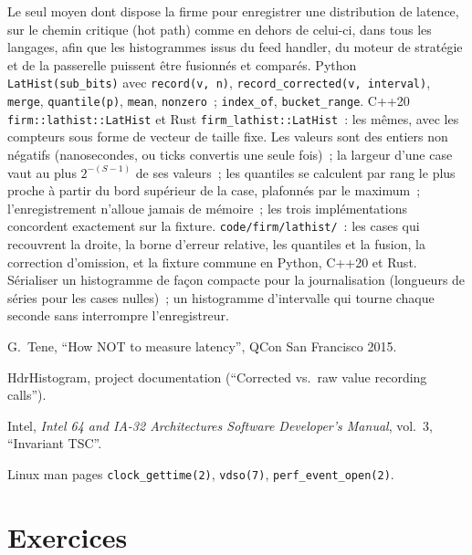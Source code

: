 \begin{build}
 Le seul moyen dont dispose la firme pour enregistrer une distribution de latence, sur le chemin critique (hot path) comme en dehors de celui-ci, dans tous les langages, afin que
les histogrammes issus du feed handler, du moteur de stratégie et de la passerelle puissent être fusionnés et comparés.
 Python \texttt{LatHist(sub\_bits)} avec \texttt{record(v, n)},
\texttt{record\_corrected(v, interval)}, \texttt{merge}, \texttt{quantile(p)}, \texttt{mean}, \texttt{nonzero}~; \texttt{index\_of}, \texttt{bucket\_range}.
C++20 \texttt{firm::lathist::LatHist} et Rust \texttt{firm\_lathist::LatHist}~: les mêmes, avec les compteurs sous forme de
vecteur de taille fixe.
 Les valeurs sont des entiers non négatifs (nanosecondes, ou ticks convertis une seule fois)~; la largeur d'une case vaut au plus
$2^{-(S-1)}$ de ses valeurs~; les quantiles se calculent par rang le plus proche à partir du bord supérieur de la case, plafonnés par le maximum~; l'enregistrement n'alloue jamais
de mémoire~; les trois implémentations concordent exactement sur la fixture.
 \texttt{code/firm/lathist/}~: les cases qui recouvrent la droite, la borne d'erreur relative, les quantiles et
la fusion, la correction d'omission, et la fixture commune en Python, C++20 et Rust.
 Sérialiser un histogramme de façon compacte pour la journalisation (longueurs de séries pour les cases nulles)~; un histogramme d'intervalle qui
tourne chaque seconde sans interrompre l'enregistreur.
\end{build}

\begin{omsources}
\item G.~Tene, ``How NOT to measure latency'', QCon San Francisco 2015.
\item HdrHistogram, project documentation (``Corrected vs.\ raw value recording calls'').
\item Intel, \emph{Intel 64 and IA-32 Architectures Software Developer's Manual}, vol.~3, ``Invariant TSC''.
\item Linux man pages \texttt{clock\_gettime(2)}, \texttt{vdso(7)}, \texttt{perf\_event\_open(2)}.
\end{omsources}

\section{Exercices}


